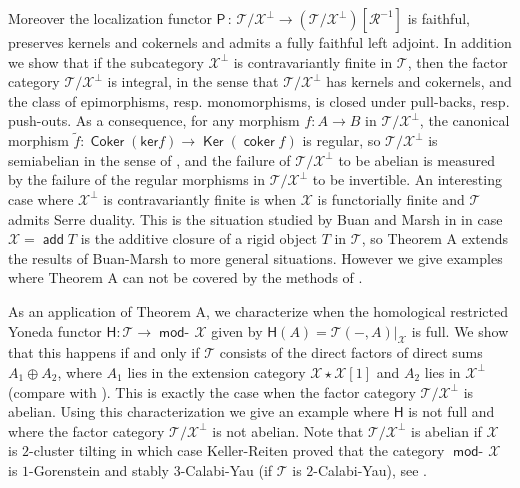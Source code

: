 \documentclass[oneside, a4paper,reqno]{amsart}
\numberwithin{equation}{section}
\theoremstyle{definition}
\begin{document}
 
 \medskip
 
 
Moreover the localization functor $\mathsf{P} \, \colon \, {\mathcal T}/{\mathcal X}^{\bot} {\longrightarrow} ({\mathcal T}/{\mathcal X}^{\bot})[\mathcal R^{-1}]$ is faithful, preserves kernels and cokernels and  admits a fully faithful left adjoint. In addition we show that if the subcategory ${\mathcal X}^{\bot}$ is contravariantly finite in ${\mathcal T}$, then the factor category ${\mathcal T}/{\mathcal X}^{\bot}$ is integral, in the sense that ${\mathcal T}/{\mathcal X}^{\bot}$ has kernels and cokernels, and the class of epimorphisms, resp. monomorphisms, is closed under pull-backs, resp. push-outs.  As a consequence, for any morphism $f \colon A {\longrightarrow} B$ in ${\mathcal T}/{\mathcal X}^{\bot}$, the canonical morphism $\widetilde{f} \colon \operatorname*{\mathsf{Coker}}(\mathsf{ker} f) {\longrightarrow} \operatorname*{\mathsf{Ker}}(\operatorname*{\mathsf{coker}} f)$ is regular, so ${\mathcal T}/{\mathcal X}^{\bot}$ is semiabelian in the sense of \cite{Rump}, and the failure of ${\mathcal T}/{\mathcal X}^{\bot}$ to be abelian is measured by the failure of the  regular morphisms in ${\mathcal T}/{\mathcal X}^{\bot}$ to be invertible. An interesting case where ${\mathcal X}^{\bot}$ is contravariantly finite is when ${\mathcal X}$ is functorially finite and  ${\mathcal T}$ admits Serre duality. This is the situation studied by Buan and Marsh in \cite{BM1, BM2} in case ${\mathcal X} = \operatorname*{\mathsf{add}} T$ is the additive closure of a rigid object $T$ in ${\mathcal T}$, so Theorem A extends the results of Buan-Marsh to more general situations. 
However we give examples where Theorem A can not be covered by the methods of \cite{BM1, BM2}.  
 
 As an application of Theorem A, we characterize when the homological restricted Yoneda functor $\mathsf{H} \colon {\mathcal T} {\longrightarrow} \operatorname*{\mathsf{mod}-\!}{\mathcal X}$ given by $\mathsf{H}(A) = {\mathcal T}(-,A)|_{\mathcal X}$ is full. We show that this happens if and only if ${\mathcal T}$ consists of the direct factors of direct sums $A_{1} \oplus A_{2}$, where $A_{1}$ lies in the extension category ${\mathcal X}\star {\mathcal X}[1]$ and $A_{2}$ lies in ${\mathcal X}^{\bot}$ (compare with \cite[Theorem 3.3]{BK}). This is exactly the case when  the factor category ${\mathcal T}/{\mathcal X}^{\bot}$ is abelian. Using this characterization we give an example where $\mathsf{H}$ is not full and where the factor category ${\mathcal T}/{\mathcal X}^{\bot}$ is not abelian. Note that ${\mathcal T}/{\mathcal X}^{\bot}$ is abelian if ${\mathcal X}$ is $2$-cluster tilting in which case Keller-Reiten proved that the category $\operatorname*{\mathsf{mod}-\!}{\mathcal X}$ is $1$-Gorenstein and stably $3$-Calabi-Yau (if ${\mathcal T}$ is $2$-Calabi-Yau), see \cite{KR1}. 
\end{document}
